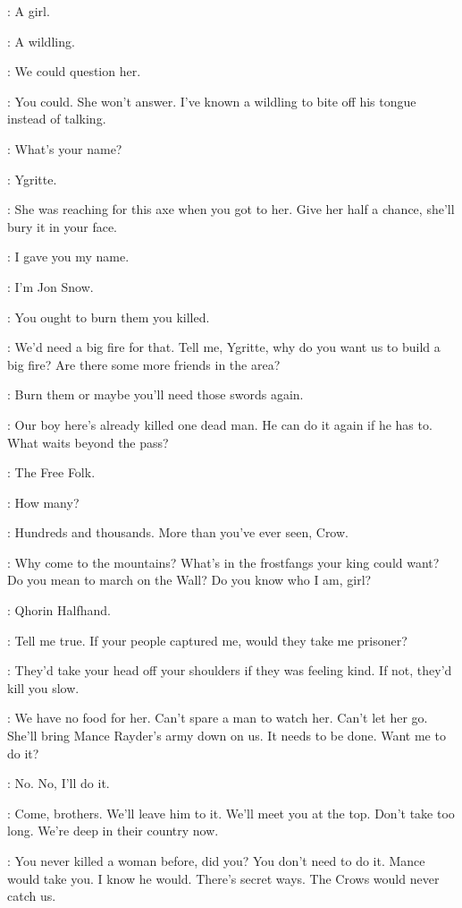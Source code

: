 \JON: A girl. 

\HALFHAND: A wildling. 

\JON: We could question her. 

\HALFHAND: You could. She won't answer. I've known a wildling to bite off his tongue instead of talking. 

\JON: What's your name? 

\YGRITTE: Ygritte. 

\HALFHAND: She was reaching for this axe when you got to her.  Give her half a chance, she'll bury it in your face. 

\YGRITTE: I gave you my name. 

\JON: I'm Jon Snow. 

\YGRITTE: You ought to burn them you killed. 

\HALFHAND: We'd need a big fire for that. Tell me, Ygritte, why do you want us to build a big fire? Are there some more friends in the area? 

\YGRITTE: Burn them or maybe you'll need those swords again. 

\HALFHAND: Our boy here's already killed one dead man. He can do it again if he has to. What waits beyond the pass? 

\YGRITTE: The Free Folk. 

\HALFHAND: How many? 

\YGRITTE: Hundreds and thousands. More than you've ever seen, Crow. 

\HALFHAND: Why come to the mountains? What's in the frostfangs your king could want? Do you mean to march on the Wall? Do you know who I am, girl? 

\YGRITTE: Qhorin Halfhand. 

\HALFHAND: Tell me true. If your people captured me, would they take me prisoner? 

\YGRITTE: They'd take your head off your shoulders if they was feeling kind. If not, they'd kill you slow. 

\HALFHAND: We have no food for her. Can't spare a man to watch her. Can't let her go. She'll bring Mance Rayder's army down on us. It needs to be done. Want me to do it? 

\JON: No. No, I'll do it. 

\HALFHAND: Come, brothers. We'll leave him to it. We'll meet you at the top. Don't take too long. We're deep in their country now. 


\YGRITTE: You never killed a woman before, did you? You don't need to do it. Mance would take you. I know he would. There's secret ways. The Crows would never catch us. 

